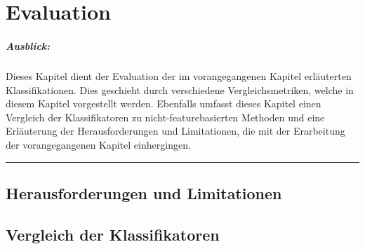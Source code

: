 
\chapter{Evaluation}

\paragraph{Ausblick:}
Dieses Kapitel dient der Evaluation der im vorangegangenen Kapitel erläuterten Klassifikationen. Dies geschieht durch verschiedene Vergleichsmetriken, welche in diesem Kapitel vorgestellt werden. Ebenfalls umfasst dieses Kapitel einen Vergleich der Klassifikatoren zu nicht-featurebasierten Methoden und eine Erläuterung der Herausforderungen und Limitationen, die mit der Erarbeitung der vorangegangenen Kapitel einhergingen.
\\
\hrule

\section{Herausforderungen und Limitationen}

\section{Vergleich der Klassifikatoren}

